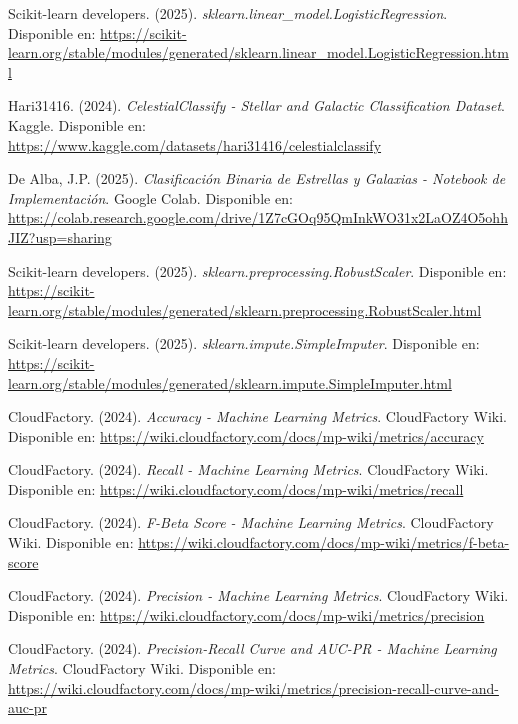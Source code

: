 \documentclass{article}
\begin{document}
\newpage

\begin{thebibliography}{9}

Scikit-learn developers. (2025). \textit{sklearn.linear\_model.LogisticRegression}. 
Disponible en: \url{https://scikit-learn.org/stable/modules/generated/sklearn.linear_model.LogisticRegression.html}

Hari31416. (2024). \textit{CelestialClassify - Stellar and Galactic Classification Dataset}. Kaggle. 
Disponible en: \url{https://www.kaggle.com/datasets/hari31416/celestialclassify}

De Alba, J.P. (2025). \textit{Clasificación Binaria de Estrellas y Galaxias - Notebook de Implementación}. Google Colab. 
Disponible en: \url{https://colab.research.google.com/drive/1Z7cGOq95QmInkWO31x2LaOZ4O5ohhJIZ?usp=sharing}

Scikit-learn developers. (2025). \textit{sklearn.preprocessing.RobustScaler}. 
Disponible en: \url{https://scikit-learn.org/stable/modules/generated/sklearn.preprocessing.RobustScaler.html}

Scikit-learn developers. (2025). \textit{sklearn.impute.SimpleImputer}. 
Disponible en: \url{https://scikit-learn.org/stable/modules/generated/sklearn.impute.SimpleImputer.html}

CloudFactory. (2024). \textit{Accuracy - Machine Learning Metrics}. CloudFactory Wiki. 
Disponible en: \url{https://wiki.cloudfactory.com/docs/mp-wiki/metrics/accuracy}

CloudFactory. (2024). \textit{Recall - Machine Learning Metrics}. CloudFactory Wiki. 
Disponible en: \url{https://wiki.cloudfactory.com/docs/mp-wiki/metrics/recall}

CloudFactory. (2024). \textit{F-Beta Score - Machine Learning Metrics}. CloudFactory Wiki. 
Disponible en: \url{https://wiki.cloudfactory.com/docs/mp-wiki/metrics/f-beta-score}

CloudFactory. (2024). \textit{Precision - Machine Learning Metrics}. CloudFactory Wiki. 
Disponible en: \url{https://wiki.cloudfactory.com/docs/mp-wiki/metrics/precision}

CloudFactory. (2024). \textit{Precision-Recall Curve and AUC-PR - Machine Learning Metrics}. CloudFactory Wiki. 
Disponible en: \url{https://wiki.cloudfactory.com/docs/mp-wiki/metrics/precision-recall-curve-and-auc-pr}


\end{thebibliography}
\end{document}
